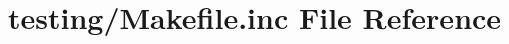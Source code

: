 \hypertarget{testing_2_makefile_8inc}{\section{testing/\+Makefile.inc File Reference}
\label{testing_2_makefile_8inc}
}

